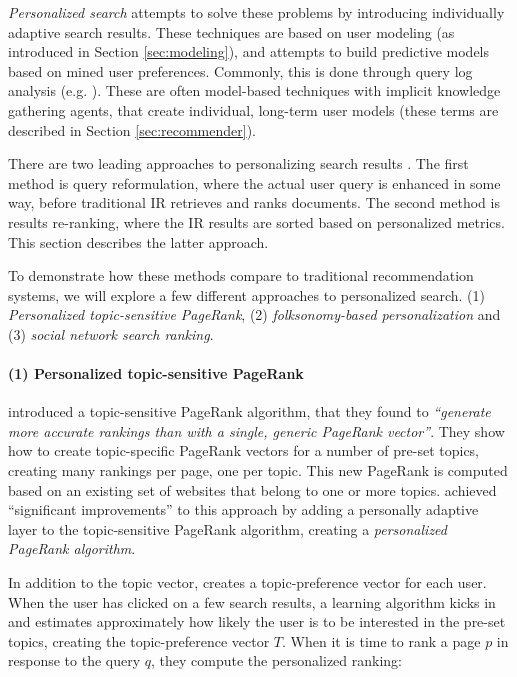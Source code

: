 \emph{Personalized search} attempts to solve these problems by introducing individually adaptive search results. 
These techniques are based on user modeling (as introduced in Section \ref{sec:modeling}),
and attempts to build predictive models based on mined user preferences.
Commonly, this is done through query log analysis (e.g. \cite{Liu2002, Sugiyama2004, Shen2005, Speretta2000}).
These are often model-based techniques with implicit knowledge gathering agents,
that create individual, long-term user models 
(these terms are described in Section \ref{sec:recommender}).

There are two leading approaches to personalizing search results \cite[p.2]{Noll2007}. 
The first method is query reformulation, where the actual user query is enhanced in some way, before traditional IR 
retrieves and ranks documents. The second method is results re-ranking, where the IR results are sorted
based on personalized metrics. This section describes the latter approach.

To demonstrate how these methods compare to traditional recommendation systems,
we will explore a few different approaches to personalized search. 
(1) \emph{Personalized topic-sensitive PageRank},
(2) \emph{folksonomy-based personalization} and
(3) \emph{social network search ranking}.


\paragraph{(1) Personalized topic-sensitive PageRank}
\citet{Haveliwala2003} introduced a topic-sensitive PageRank algorithm, that they found
to \emph{``generate more accurate rankings than with a single, generic PageRank vector''}. 
They show how to create topic-specific PageRank vectors for a number of pre-set topics,
creating many rankings per page, one per topic.
This new PageRank is computed based on an existing set of websites that belong to one or more topics.
\citet{Qiu2006} achieved ``significant improvements'' to this approach by adding a personally adaptive layer
to the topic-sensitive PageRank algorithm, creating a \emph{personalized PageRank algorithm}. 

In addition to the topic vector, \citeauthor{Qiu2006}
creates a topic-preference vector for each user. When the user has clicked on a few search results,
a learning algorithm kicks in and estimates approximately how likely the user is to be interested 
in the pre-set topics, creating the topic-preference vector $T$. When it is time to rank a 
page $p$ in response to the query $q$, they compute the personalized ranking:

